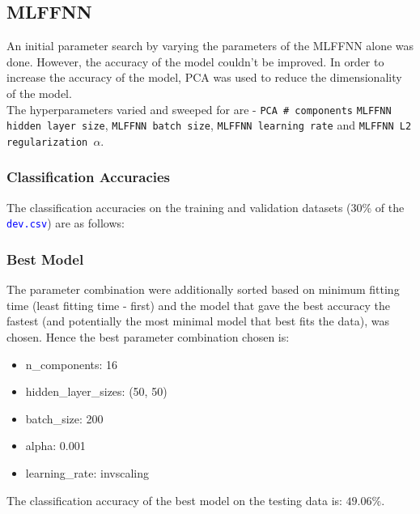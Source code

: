 \documentclass[11pt,a4paper]{article}
\newcommand{\noi}{\noindent}
\def\tt#1{\texttt{#1}}
\def\colortt#1{\textcolor{blue}{\texttt{#1}}}
\begin{document}
\subsection{MLFFNN}
An initial parameter search by varying the parameters of the MLFFNN alone was done. However, the accuracy of the model couldn't be improved. In order to increase the accuracy of the model, PCA was used to reduce the dimensionality of the model.\\

\noi
The hyperparameters varied and sweeped for are - \tt{PCA \# components} \tt{MLFFNN hidden layer size}, \tt{MLFFNN batch size}, \tt{MLFFNN learning rate} and \tt{MLFFNN L2 regularization $\alpha$}.

\subsubsection{Classification Accuracies}
The classification accuracies on the training and validation datasets (30\% of the \colortt{dev.csv}) are as follows:


\subsubsection{Best Model}
The parameter combination were additionally sorted based on minimum fitting time (least fitting time - first) and the model that gave the best accuracy the fastest (and potentially the most minimal model that best fits the data), was chosen. Hence the best parameter combination chosen is:
\begin{itemize}
    \itemsep0em
    \item n\_components: 16
    \item hidden\_layer\_sizes: (50, 50)
    \item batch\_size: 200
    \item alpha: 0.001
    \item learning\_rate: invscaling
\end{itemize}

\noi
The classification accuracy of the best model on the testing data is: $49.06\%$. \\
\end{document}
